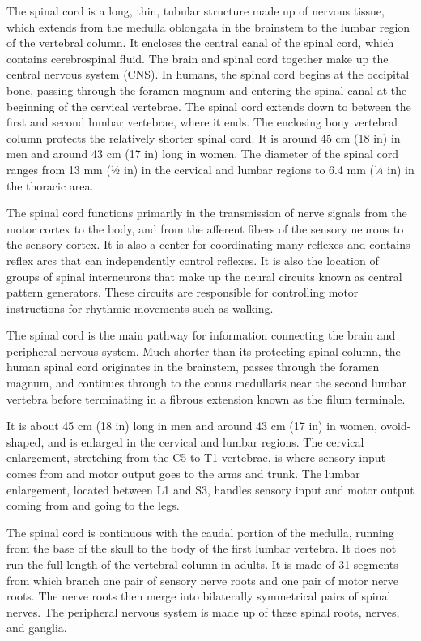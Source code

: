 \documentclass[]{book}
\begin{document}
The spinal cord is a long, thin, tubular structure made up of nervous tissue, which extends from the medulla oblongata in the brainstem to the lumbar region of the vertebral column. It encloses the central canal of the spinal cord, which contains cerebrospinal fluid. The brain and spinal cord together make up the central nervous system (CNS). In humans, the spinal cord begins at the occipital bone, passing through the foramen magnum and entering the spinal canal at the beginning of the cervical vertebrae. The spinal cord extends down to between the first and second lumbar vertebrae, where it ends. The enclosing bony vertebral column protects the relatively shorter spinal cord. It is around 45 cm (18 in) in men and around 43 cm (17 in) long in women. The diameter of the spinal cord ranges from 13 mm (1⁄2 in) in the cervical and lumbar regions to 6.4 mm (1⁄4 in) in the thoracic area.

The spinal cord functions primarily in the transmission of nerve signals from the motor cortex to the body, and from the afferent fibers of the sensory neurons to the sensory cortex. It is also a center for coordinating many reflexes and contains reflex arcs that can independently control reflexes. It is also the location of groups of spinal interneurons that make up the neural circuits known as central pattern generators. These circuits are responsible for controlling motor instructions for rhythmic movements such as walking.

The spinal cord is the main pathway for information connecting the brain and peripheral nervous system. Much shorter than its protecting spinal column, the human spinal cord originates in the brainstem, passes through the foramen magnum, and continues through to the conus medullaris near the second lumbar vertebra before terminating in a fibrous extension known as the filum terminale.

It is about 45 cm (18 in) long in men and around 43 cm (17 in) in women, ovoid-shaped, and is enlarged in the cervical and lumbar regions. The cervical enlargement, stretching from the C5 to T1 vertebrae, is where sensory input comes from and motor output goes to the arms and trunk. The lumbar enlargement, located between L1 and S3, handles sensory input and motor output coming from and going to the legs.

The spinal cord is continuous with the caudal portion of the medulla, running from the base of the skull to the body of the first lumbar vertebra. It does not run the full length of the vertebral column in adults. It is made of 31 segments from which branch one pair of sensory nerve roots and one pair of motor nerve roots. The nerve roots then merge into bilaterally symmetrical pairs of spinal nerves. The peripheral nervous system is made up of these spinal roots, nerves, and ganglia.
\end{document}

